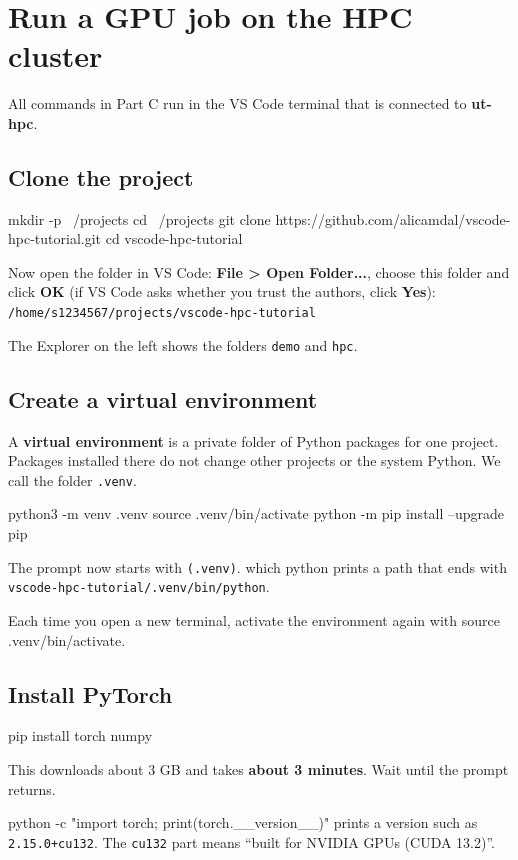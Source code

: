 \documentclass[11pt,a4paper]{article}
\newcommand{\menu}[1]{\textsf{\textbf{#1}}}
\newcommand{\code}[1]{\colorbox{tint}{\ttfamily\small #1}}
\begin{document}
\newpage
\section{Run a GPU job on the HPC cluster}
All commands in Part C run in the VS Code terminal that is connected to \textbf{ut-hpc}.

\subsection{Clone the project}
\begin{cmd}
mkdir -p ~/projects
cd ~/projects
git clone https://github.com/alicamdal/vscode-hpc-tutorial.git
cd vscode-hpc-tutorial
\end{cmd}
Now open the folder in VS Code: \menu{File > Open Folder...}, choose this folder and click \menu{OK} (if VS Code asks whether you trust the authors, click \menu{Yes}):\\
\texttt{/home/s1234567/projects/vscode-hpc-tutorial}
\begin{checkbox}The Explorer on the left shows the folders \texttt{demo} and \texttt{hpc}.\end{checkbox}

\subsection{Create a virtual environment}
A \textbf{virtual environment} is a private folder of Python packages for one project. Packages installed there do not change other projects or the system Python. We call the folder \texttt{.venv}.
\begin{cmd}
python3 -m venv .venv
source .venv/bin/activate
python -m pip install --upgrade pip
\end{cmd}
\begin{checkbox}The prompt now starts with \texttt{(.venv)}. \code{which python} prints a path that ends with \texttt{vscode-hpc-tutorial/.venv/bin/python}.\end{checkbox}
\begin{notebox}Each time you open a new terminal, activate the environment again with \code{source .venv/bin/activate}.\end{notebox}

\subsection{Install PyTorch}
\begin{cmd}
pip install torch numpy
\end{cmd}
This downloads about 3 GB and takes \textbf{about 3 minutes}. Wait until the prompt returns.
\begin{checkbox}\code{python -c "import torch; print(torch.\_\_version\_\_)"} prints a version such as \texttt{2.15.0+cu132}. The \texttt{cu132} part means ``built for NVIDIA GPUs (CUDA 13.2)''.\end{checkbox}
\end{document}
